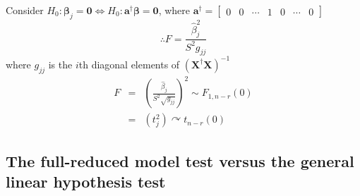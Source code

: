 \documentclass{article}
\begin{document}
\bigskip

Consider $H_{0}:\mathbf{\beta }_{j}\mathbf{=0}\Leftrightarrow H_{0}:\mathbf{a%
}^{\dagger }\mathbf{\beta =0}$, where $\mathbf{a}^{\dagger }=\left[ 
\begin{array}{ccccccc}
0 & 0 & \cdots & 1 & 0 & \cdots & 0%
\end{array}%
\right] $%
\begin{equation*}
\therefore F=\frac{\hat{\beta}_{j}^{2}}{S^{2}g_{jj}}
\end{equation*}%
where $g_{jj}$ is the $i$th diagonal elements of $\left( \mathbf{X}^{\dagger
}\mathbf{X}\right) ^{-1}$%
\begin{eqnarray*}
F &=&\left( \frac{\hat{\beta}_{j}}{S^{2}\sqrt{g_{jj}}}\right) ^{2}\sim
F_{1,n-r}\left( 0\right) \\
&=&\left( t_{j}^{2}\right) \curvearrowright t_{n-r}\left( 0\right)
\end{eqnarray*}

\bigskip

\bigskip

\subsection{The full-reduced model test versus the general linear hypothesis
test}
\end{document}
